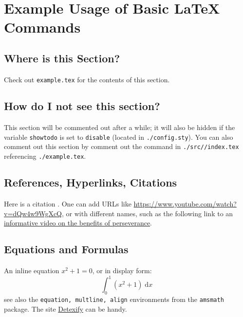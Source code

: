 \newpage

\section*{Example Usage of Basic {\LaTeX} Commands}

\subsection*{Where is this Section?}
\paragraph{}Check out \texttt{example.tex} for the contents of this section.

\subsection*{How do I not see this section?}
\paragraph{}This section will be commented out after a while; it will also be hidden if the variable \texttt{showtodo} is set to \texttt{disable} (located in \texttt{./config.sty}). You can also comment out this section by comment out the command in \texttt{./src/\docSrc/index.tex} referencing \texttt{./example.tex}.

\subsection*{References, Hyperlinks, Citations}
\paragraph{}Here is a citation \cite{example2024}. One can add URLs like \url{https://www.youtube.com/watch?v=dQw4w9WgXcQ}, or with different names, such as the following link to an \href{https://www.youtube.com/watch?v=dQw4w9WgXcQ}{informative video on the benefits of perseverance}.

\subsection*{Equations and Formulas}
\paragraph{}An inline equation $x^2+1=0$, or in display form:
\[\int_0^1 (x^2+1)\;\mathrm{d}x\]
see also the \texttt{equation, multline, align} environments from the \texttt{amsmath} package. The site \href{https://detexify.kirelabs.org/classify.html}{Detexify} can be handy.

